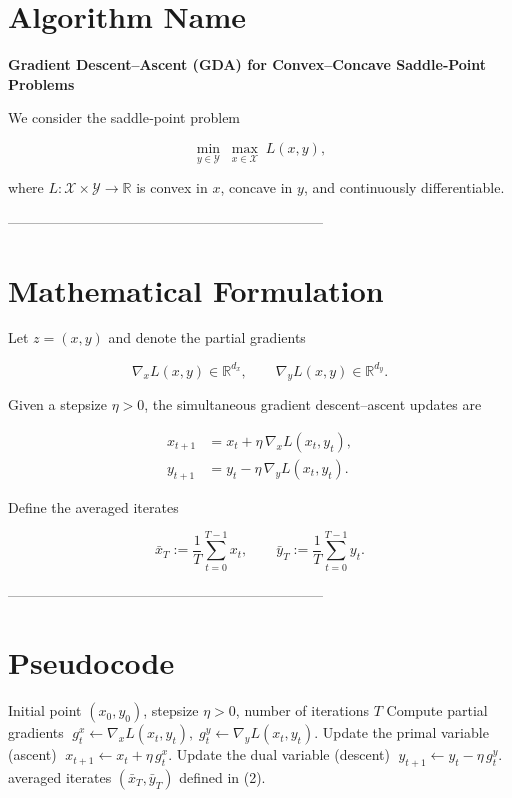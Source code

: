 \documentclass{article}
\begin{document}
\section*{Algorithm Name}
\textbf{Gradient Descent–Ascent (GDA) for Convex–Concave Saddle‑Point Problems}

We consider the saddle‑point problem  

\[
\min_{y\in\mathcal{Y}}\;\max_{x\in\mathcal{X}} \;L(x,y),
\]

where \(L:\mathcal{X}\times\mathcal{Y}\rightarrow\mathbb{R}\) is convex in \(x\), concave in \(y\), and continuously differentiable.

--------------------------------------------------------------------

\section*{Mathematical Formulation}
Let \(z=(x,y)\) and denote the partial gradients  

\[
\nabla_x L(x,y)\in\mathbb{R}^{d_x},\qquad 
\nabla_y L(x,y)\in\mathbb{R}^{d_y}.
\]

Given a stepsize \(\eta>0\), the simultaneous gradient descent–ascent updates are  

\[
\boxed{
\begin{aligned}
x_{t+1} &= x_t + \eta\,\nabla_x L(x_t,y_t),\\
y_{t+1} &= y_t - \eta\,\nabla_y L(x_t,y_t).
\end{aligned}}
\tag{1}
\]

Define the averaged iterates  

\[
\bar x_T:=\frac1T\sum_{t=0}^{T-1}x_t,\qquad 
\bar y_T:=\frac1T\sum_{t=0}^{T-1}y_t .
\tag{2}
\]

--------------------------------------------------------------------

\section*{Pseudocode}
\begin{algorithm}[H]
\caption{Gradient Descent–Ascent (GDA)}
\begin{algorithmic}[1]
\Require Initial point \((x_0,y_0)\), stepsize \(\eta>0\), number of iterations \(T\)
    \State Compute partial gradients 
          \(\;g^x_t\gets\nabla_x L(x_t,y_t),\;
                g^y_t\gets\nabla_y L(x_t,y_t)\).
    \State Update the primal variable (ascent)   
          \(\;x_{t+1}\gets x_t+\eta\,g^x_t.\)
    \State Update the dual variable (descent)   
          \(\;y_{t+1}\gets y_t-\eta\,g^y_t.\)
\EndFor
\State \Return averaged iterates \((\bar x_T,\bar y_T)\) defined in (2).
\end{algorithmic}
\end{algorithm}
\end{document}
